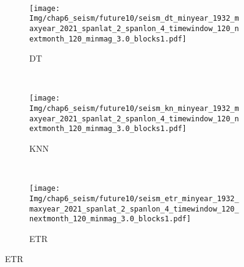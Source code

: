 \begin{figure}[!htbp]
\begin{subfigure}[b]{0.45\textwidth}
    \vspace{-1cm}
    \label{fig:seism_gbr_minyear_1932_maxyear_2021_spanlat_2_spanlon_4_timewindow_120_nextmonth_120_minmag_3.0_blocks1}
  \end{subfigure}
  ~
  \begin{subfigure}[b]{0.45\textwidth}
    \caption{DT}
    \vspace{-0.2cm}
    \texttt{[image: Img/chap6\_seism/future10/seism\_dt\_minyear\_1932\_maxyear\_2021\_spanlat\_2\_spanlon\_4\_timewindow\_120\_nextmonth\_120\_minmag\_3.0\_blocks1.pdf]}
    \vspace{-1cm}
    \label{fig:seism_dt_minyear_1932_maxyear_2021_spanlat_2_spanlon_4_timewindow_120_nextmonth_120_minmag_3.0_blocks1}
  \end{subfigure}
  \\
  \begin{subfigure}[b]{0.45\textwidth}
    \caption{KNN}
    \vspace{-0.2cm}
    \texttt{[image: Img/chap6\_seism/future10/seism\_kn\_minyear\_1932\_maxyear\_2021\_spanlat\_2\_spanlon\_4\_timewindow\_120\_nextmonth\_120\_minmag\_3.0\_blocks1.pdf]}
    \vspace{-1cm}
    \label{fig:seism_knn_minyear_1932_maxyear_2021_spanlat_2_spanlon_4_timewindow_120_nextmonth_120_minmag_3.0_blocks1}
  \end{subfigure}
  ~
  \begin{subfigure}[b]{0.45\textwidth}
    \caption{ETR}
    \vspace{-0.2cm}
    \texttt{[image: Img/chap6\_seism/future10/seism\_etr\_minyear\_1932\_maxyear\_2021\_spanlat\_2\_spanlon\_4\_timewindow\_120\_nextmonth\_120\_minmag\_3.0\_blocks1.pdf]}
    \vspace{-1cm}
    \label{fig:seism_etr_minyear_1932_maxyear_2021_spanlat_2_spanlon_4_timewindow_120_nextmonth_120_minmag_3.0_blocks1}
  \end{subfigure}
  \label{fig:seism_minyear_1932_maxyear_2021_spanlat_2_spanlon_4_timewindow_120_nextmonth_120_minmag_3.0_blocks1}
\end{figure}



